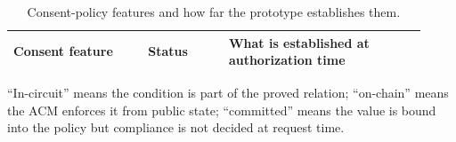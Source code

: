 \begin{table}[htbp]
  \centering\footnotesize
  \caption{Consent-policy features and how far the prototype establishes them.}
  \label{tab:policy-support}
  \setlength{\tabcolsep}{4pt}
  \begin{tabular}{p{0.30\linewidth}p{0.18\linewidth}p{0.44\linewidth}}
    \toprule
    Consent feature & Status & What is established at authorization time \\
    \midrule
    
  \end{tabular}

  \begin{tablenote}
    ``In-circuit'' means the condition is part of the proved relation; ``on-chain''
    means the ACM enforces it from public state; ``committed'' means the value is
    bound into the policy but compliance is not decided at request time.
  \end{tablenote}
\end{table}
